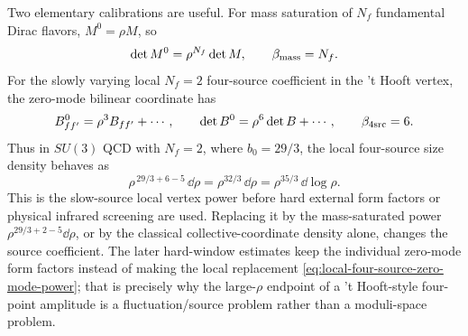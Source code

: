 \begin{controlledapproximation}
Two elementary calibrations are useful.  For mass saturation of \(N_f\)
fundamental Dirac flavors, \(M^0=\rho M\), so
\[
  \det M^0=\rho^{N_f}\det M,
  \qquad \beta_{\rm mass}=N_f .
\]
For the slowly varying local \(N_f=2\) four-source coefficient in the
't Hooft vertex, the zero-mode bilinear coordinate has
\begin{equation}
  B^0_{ff'}=\rho^3 B_{ff'}+\cdots,
  \qquad
  \det B^0=\rho^6\det B+\cdots,
  \qquad \beta_{4{\rm src}}=6 .
  \label{eq:local-four-source-zero-mode-power}
\end{equation}
Thus in \(SU(3)\) QCD with \(N_f=2\), where \(b_0=29/3\), the local
four-source size density behaves as
\begin{equation}
  \rho^{\,29/3+6-5}\,\dd\rho
  =
  \rho^{32/3}\,\dd\rho
  =
  \rho^{35/3}\,\dd\log\rho .
  \label{eq:su3-nf2-local-four-source-size-power}
\end{equation}
This is the slow-source local vertex power before hard external form factors
or physical infrared screening are used.  Replacing it by the
mass-saturated power \(\rho^{29/3+2-5}\dd\rho\), or by the classical
collective-coordinate density alone, changes the source coefficient.  The
later hard-window estimates keep the individual zero-mode form factors instead
of making the local replacement
\eqref{eq:local-four-source-zero-mode-power}; that is precisely why the
large-\(\rho\) endpoint of a 't Hooft-style four-point amplitude is a
fluctuation/source problem rather than a moduli-space problem.
\end{controlledapproximation}

